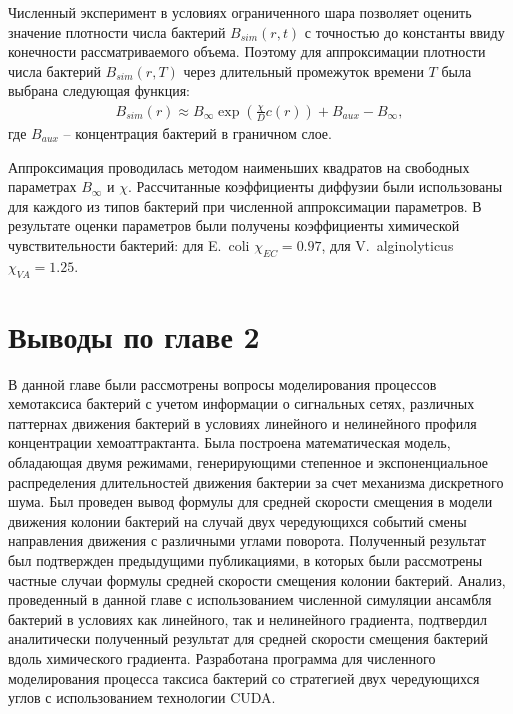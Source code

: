 Численный эксперимент в условиях ограниченного шара позволяет оценить значение плотности числа бактерий $B_{sim}(r, t)$ с точностью до константы ввиду конечности рассматриваемого объема. Поэтому для аппроксимации плотности числа бактерий $B_{sim}(r, T)$ через длительный промежуток времени $T$ была выбрана следующая функция:
\begin{equation}
    \begin{aligned}
        B_{sim}(r) \approx B_{\infty} \exp \left ( \frac{\chi}{D}c(r) \right ) + B_{aux} - B_{\infty},
    \label{eq:keller-sigel-stationary-solution-approx}
    \end{aligned}
\end{equation}
где $B_{aux}$ -- концентрация бактерий в граничном слое.

Аппроксимация проводилась методом наименьших квадратов на свободных параметрах $B_{\infty}$ и $\chi$. Рассчитанные коэффициенты диффузии были использованы для каждого из типов бактерий при численной аппроксимации параметров. В результате оценки параметров были получены коэффициенты химической чувствительности бактерий: для E.~coli $\chi_{EC}=0.97$, для V.~alginolyticus $\chi_{VA}=1.25$.

\section{Выводы по главе 2}\label{sec:ch3/sec7}

В данной главе были рассмотрены вопросы моделирования процессов хемотаксиса бактерий с учетом информации о сигнальных сетях, различных паттернах движения бактерий в условиях линейного и нелинейного профиля концентрации хемоаттрактанта. Была построена математическая модель, обладающая двумя режимами, генерирующими степенное и экспоненциальное распределения длительностей движения бактерии за счет механизма дискретного шума. Был проведен вывод формулы для средней скорости смещения в модели движения колонии бактерий на случай двух чередующихся событий смены направления движения с различными углами поворота. Полученный результат был подтвержден предыдущими публикациями, в которых были рассмотрены частные случаи формулы средней скорости смещения колонии бактерий. Анализ, проведенный в данной главе с использованием численной симуляции ансамбля бактерий в условиях как линейного, так и нелинейного градиента, подтвердил аналитически полученный результат для средней скорости смещения бактерий вдоль химического градиента. Разработана программа для численного моделирования процесса таксиса бактерий со стратегией двух чередующихся углов с использованием технологии CUDA.
